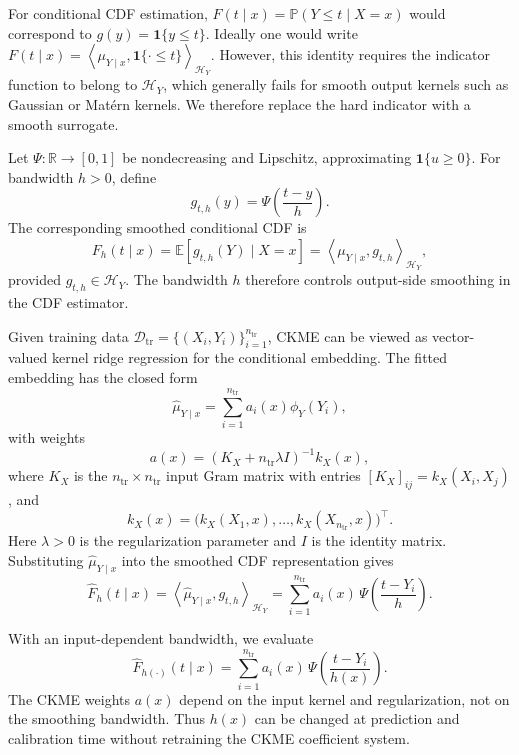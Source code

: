 \documentclass[11pt]{article}
\newcommand{\Hcal}{\mathcal H}
\newcommand{\Dcal}{\mathcal D}
\newcommand{\Pp}{\mathbb P}
\newcommand{\E}{\mathbb E}
\newcommand{\R}{\mathbb R}
\newcommand{\ind}{\mathbf 1}
\newcommand{\inner}[2]{\left\langle #1,#2 \right\rangle}
\begin{document}
For conditional CDF estimation, \(F(t\mid x)=\Pp(Y\le t\mid X=x)\) would correspond to \(g(y)=\ind\{y\le t\}\). Ideally one would write \(F(t\mid x)=\inner{\mu_{Y\mid x}}{\ind\{\cdot\le t\}}_{\Hcal_Y}\). However, this identity requires the indicator function to belong to \(\Hcal_Y\), which generally fails for smooth output kernels such as Gaussian or Matérn kernels. We therefore replace the hard indicator with a smooth surrogate.

Let \(\Psi:\R\to[0,1]\) be nondecreasing and Lipschitz, approximating \(\ind\{u\ge0\}\). For bandwidth \(h>0\), define
\[
  g_{t,h}(y)=\Psi\!\left(\frac{t-y}{h}\right).
\]
The corresponding smoothed conditional CDF is
\[
  F_h(t\mid x)=\E[g_{t,h}(Y)\mid X=x]
  =
  \inner{\mu_{Y\mid x}}{g_{t,h}}_{\Hcal_Y},
\]
provided \(g_{t,h}\in\Hcal_Y\). The bandwidth \(h\) therefore controls output-side smoothing in the CDF estimator.

Given training data \(\Dcal_{\mathrm{tr}}=\{(X_i,Y_i)\}_{i=1}^{n_{\mathrm{tr}}}\), CKME can be viewed as vector-valued kernel ridge regression for the conditional embedding. The fitted embedding has the closed form
\[
  \widehat\mu_{Y\mid x}=\sum_{i=1}^{n_{\mathrm{tr}}}a_i(x)\phi_Y(Y_i),
\]
with weights
\[
  a(x)=(K_X+n_{\mathrm{tr}}\lambda I)^{-1}k_X(x),
\]
where \(K_X\) is the \(n_{\mathrm{tr}}\times n_{\mathrm{tr}}\) input Gram matrix with entries \([K_X]_{ij}=k_X(X_i,X_j)\), and
\[
  k_X(x)=\big(k_X(X_1,x),\ldots,k_X(X_{n_{\mathrm{tr}}},x)\big)^\top .
\]
Here \(\lambda>0\) is the regularization parameter and \(I\) is the identity matrix. Substituting \(\widehat\mu_{Y\mid x}\) into the smoothed CDF representation gives
\begin{equation}
  \widehat F_h(t\mid x)=
  \inner{\widehat\mu_{Y\mid x}}{g_{t,h}}_{\Hcal_Y}
  =
  \sum_{i=1}^{n_{\mathrm{tr}}} a_i(x)\,
  \Psi\!\left(\frac{t-Y_i}{h}\right).
  \label{eq:ckme-cdf-fixed}
\end{equation}

With an input-dependent bandwidth, we evaluate
\begin{equation}
  \widehat F_{h(\cdot)}(t\mid x)=
  \sum_{i=1}^{n_{\mathrm{tr}}} a_i(x)\,
  \Psi\!\left(\frac{t-Y_i}{h(x)}\right).
  \label{eq:ckme-cdf-adaptive}
\end{equation}
The CKME weights \(a(x)\) depend on the input kernel and regularization, not on the smoothing bandwidth. Thus \(h(x)\) can be changed at prediction and calibration time without retraining the CKME coefficient system.
\end{document}
